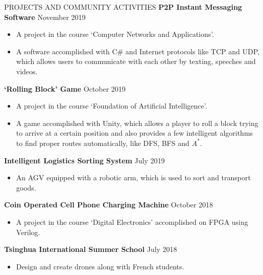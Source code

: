 \documentclass{resume} %
\begin{document}

\begin{rSection}{PROJECTS AND COMMUNITY ACTIVITIES} 
{\textbf{P2P Instant Messaging Software}} \hfill November 2019\\
	\begin{itemize}
	\item A project in the course `Computer Networks and Applications'.
	\item A software accomplished with C\# and Internet protocols like TCP and UDP, which allows users to communicate with each other by texting, speeches and videos.\\
	\end{itemize}
{\textbf{`Rolling Block' Game}} \hfill October 2019\\
	\begin{itemize}
	\item A project in the course `Foundation of Artificial Intelligence'.
	\item A game accomplished with Unity, which allows a player to roll a block trying to arrive at a certain position and also provides a few intelligent algorithms to find proper routes automatically, like DFS, BFS and $A^*$.\\
	\end{itemize}
{\textbf{Intelligent Logistics Sorting System}} \hfill July 2019\\
	\begin{itemize}
\item An AGV equipped with a robotic arm, which is used to sort and transport goods.\\
	\end{itemize}
{\textbf{Coin Operated Cell Phone Charging Machine}} \hfill October 2018\\
	\begin{itemize}
	\item A project in the course `Digital Electronics' accomplished on FPGA using Verilog.\\
	\end{itemize}
{\textbf{Tsinghua International Summer School}} \hfill July 2018\\
	\begin{itemize}
		\item Design and create drones along with French students.
	\end{itemize}
\end{rSection} 
\end{document}
